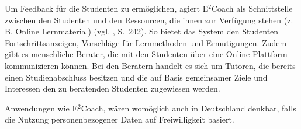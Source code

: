 Um Feedback für die Studenten zu ermöglichen, agiert E$^2$Coach als Schnittstelle zwischen
den Studenten und den Ressourcen, die ihnen zur Verfügung stehen (z. B. Online Lernmaterial) (vgl. \cite{Mattingly}, S.~242).
So bietet das System den Studenten Fortschrittsanzeigen, Vorschläge für Lernmethoden und Ermutigungen.
Zudem gibt es menschliche Berater, die mit den Studenten über eine Online-Plattform kommunizieren können.
Bei den Beratern handelt es sich um Tutoren, die bereits einen Studienabschluss besitzen und die auf Basis
gemeinsamer Ziele und Interessen den zu beratenden Studenten zugewiesen werden.

Anwendungen wie E$^2$Coach, wären womöglich auch in Deutschland denkbar, falls die Nutzung personenbezogener
Daten auf Freiwilligkeit basiert.


